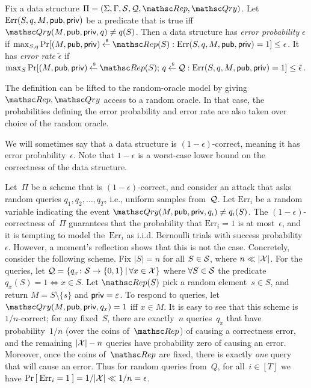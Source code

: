 \begin{definition} \rm
Fix a data structure $\setprim=(\Sigma,\Gamma,\calS,\calQ,\Rep,
\Qry)$. Let $\mathrm{Err}(S,q,M,{\sf pub},{\sf priv})$ be a predicate that is
true iff $\Qry(M, \pubaux,\privaux, q) \neq q(S)$.  Then a data structure
has \emph{error probability} $\epsilon$ if
$\max_{S,q}\Pr[(M,\pubaux,\privaux) \getsr \Rep(S) :
\mathrm{Err}(S,q,M,\pubaux,\privaux)=1 ] \leq \epsilon$.
%
It has \emph{error rate} $\tilde{\epsilon}$ if
$\max_{S}\Pr[(M,\pubaux,\privaux) \getsr \Rep(S);\, q \getsr \calQ :
\mathrm{Err}(S,q,M,\pubaux,\privaux)=1] \leq \tilde{\epsilon}$. \hfill\dqed
\end{definition}

\noindent The definition can be lifted to the random-oracle model by
giving $\Rep, \Qry$ access to a random oracle. In that case, the
probabilities defining the error probability and error rate are also
taken over choice of the random oracle.

We will sometimes say that a data structure is
$(1-\epsilon)$-correct, meaning it has error probability~$\epsilon$.
Note that $1-\epsilon$ is a worst-case lower bound on the
correctness of the data structure.


\def\bin{{\sf Bin}}
Let~$\Pi$ be a scheme that is $(1-\epsilon)$-correct, and consider
an attack that asks random queries $q_1,q_2,\ldots,q_T$, i.e.,
uniform samples from~${\cal Q}$.
Let $\mathrm{Err}_i$ be a random variable indicating the event $\Qry(M,\pubaux,\privaux,q_i)\neq q_i(S)$.
The $(1-\epsilon)$-correctness of~$\Pi$ guarantees that the probability that $\mathrm{Err}_i=1$ is at most~$\epsilon$,
and it is tempting to model the~$\mathrm{Err}_i$ as i.i.d. Bernoulli trials with success probability~$\epsilon$.
However, a moment's reflection shows that this is not the case.  Concretely, consider the following scheme.  Fix $|S|=n$ for all $S \in {\cal S}$, where $n \ll |{\cal X}|$.  For the queries, let ${\cal Q} = \{q_x\colon {\cal S} \to \{0,1\} \,|\, \forall x \in {\cal X}\}$ where $\forall S \in {\cal S}$ the predicate $q_x(S)=1 \Leftrightarrow x \in S$.  Let $\Rep(S)$ pick a random element~$s \in S$, and return $M = S \setminus \{s\}$ and ${\sf priv} = \varepsilon$.  To respond to queries, let~$\Qry(M,\pubaux,\privaux,q_x)=1$ iff $x \in M$.  It is easy to see that this scheme is $1/n$-correct; for any fixed~$S$, there are exactly~$n$ queries~$q_x$ that have probability~$1/n$  (over the coins of~$\Rep$) of causing a correctness error, and the remaining $|{\cal X}|-n$ queries have probability zero of causing an error.  Moreover, once the coins of~$\Rep$ are fixed, there is exactly \emph{one} query that will cause an error.  Thus for random queries from~$Q$, for all~$i\in[T]$ we have $\Pr\left[\: \mathrm{Err}_i=1 \:\right]=1/|{\cal X}| \ll 1/n = \epsilon$.

